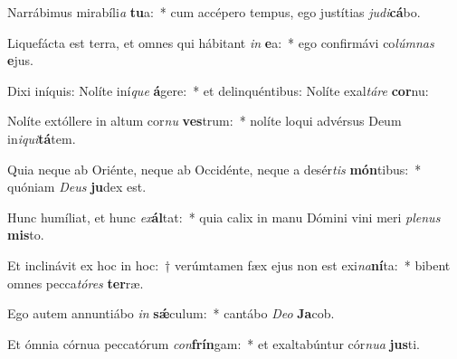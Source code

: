 \item Narrábimus mirabíli\textit{a} \textbf{tu}a:~* cum accépero tempus, ego justítias \textit{ju}\textit{di}\textbf{cá}bo.
\item Liquefácta est terra, et omnes qui hábitant \textit{in} \textbf{e}a:~* ego confirmávi co\textit{lúm}\textit{nas} \textbf{e}jus.
\item Dixi iníquis: Nolíte iní\textit{que} \textbf{á}gere:~* et delinquéntibus: Nolíte exal\textit{tá}\textit{re} \textbf{cor}nu:
\item Nolíte extóllere in altum cor\textit{nu} \textbf{ves}trum:~* nolíte loqui advérsus Deum in\textit{i}\textit{qui}\textbf{tá}tem.
\item Quia neque ab Oriénte, neque ab Occidénte, neque a desér\textit{tis} \textbf{món}tibus:~* quóniam \textit{De}\textit{us} \textbf{ju}dex est.
\item Hunc humíliat, et hunc \textit{ex}\textbf{ál}tat:~* quia calix in manu Dómini vini meri \textit{ple}\textit{nus} \textbf{mis}to.
\item Et inclinávit ex hoc in hoc:~† verúmtamen fæx ejus non est exi\textit{na}\textbf{ní}ta:~* bibent omnes pecca\textit{tó}\textit{res} \textbf{ter}ræ.
\item Ego autem annuntiábo \textit{in} \textbf{sǽ}culum:~* cantábo \textit{De}\textit{o} \textbf{Ja}cob.
\item Et ómnia córnua peccatórum \textit{con}\textbf{frín}gam:~* et exaltabúntur cór\textit{nu}\textit{a} \textbf{jus}ti.
